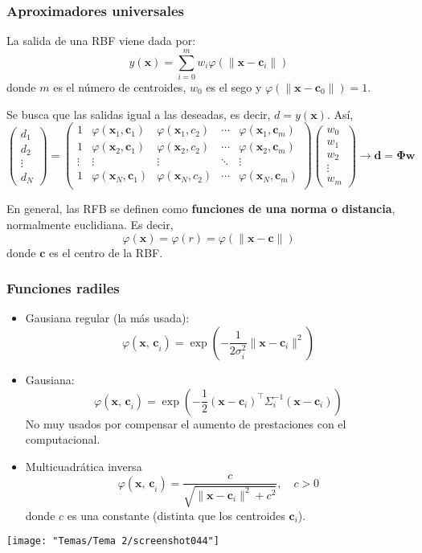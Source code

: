\subsubsection{Aproximadores universales}
La salida de una RBF viene dada por: \[ y(\mathbf{x})=\sum_{i=0}^{m}w_i\varphi(\|\mathbf{x-c}_i\|) \] donde $m$ es el número de centroides, $w_0$ es el sego y $\varphi(\|\mathbf{x-c}_0\|)=1$.

Se busca que las salidas igual a las deseadas, es decir, $d=y(\mathbf{x})$. Así, \[ \begin{pmatrix}
	d_1\\
	d_2\\
	\vdots\\
	d_N
\end{pmatrix}=\begin{pmatrix}
1 &\varphi(\mathbf{x}_1,\mathbf{c}_1) & \varphi(\mathbf{x}_1,c_2) & \cdots & \varphi(\mathbf{x}_1,\mathbf{c}_m)\\
1 &\varphi(\mathbf{x}_2,\mathbf{c}_1) & \varphi(\mathbf{x}_2,c_2) & \cdots & \varphi(\mathbf{x}_2,\mathbf{c}_m)\\
\vdots & \vdots & \vdots & \ddots & \vdots\\
1 & \varphi(\mathbf{x}_N,\mathbf{c}_1) & \varphi(\mathbf{x}_N,c_2) & \cdots & \varphi(\mathbf{x}_N,\mathbf{c}_m)\\
\end{pmatrix}\begin{pmatrix}
w_0\\
w_1\\
w_2\\
\vdots\\
w_m
\end{pmatrix}\longrightarrow\mathbf{d=\Phi w} \]

En general, las RFB se definen como \textbf{funciones de una norma o distancia}, normalmente euclidiana. Es decir, \[ \varphi(\mathbf{x})=\varphi(r)=\varphi(\|\mathbf{x-c}\|) \] donde $\mathbf{c}$ es el centro de la RBF.
\subsubsection{Funciones radiles}
\begin{itemize}
	\item Gausiana regular (la más usada): \[\varphi(\mathbf{x,\,c}_i)=\exp\left(-\dfrac{1}{2\sigma_i^2}\|\mathbf{x-c}_i\|^2\right)  \]
	\item Gausiana: \[ \varphi(\mathbf{x,\,c}_i)=\exp\left(-\dfrac{1}{2}(\mathbf{x-c}_i)^\intercal\Sigma_i^{-1}(\mathbf{x-c}_i)\right) \]No muy usados por compensar el aumento de prestaciones con el computacional.
	\item Multicuadrática inversa \[ \varphi(\mathbf{x,\,c}_i)=\dfrac{c}{\sqrt{\|\mathbf{x-c}_i\|^2+c^2}},\quad c>0 \] donde $c$ es una constante (distinta que los centroides $\mathbf{c}_i$).
\end{itemize}
\begin{center} 
	\texttt{[image: "Temas/Tema 2/screenshot044"]}
\end{center}
